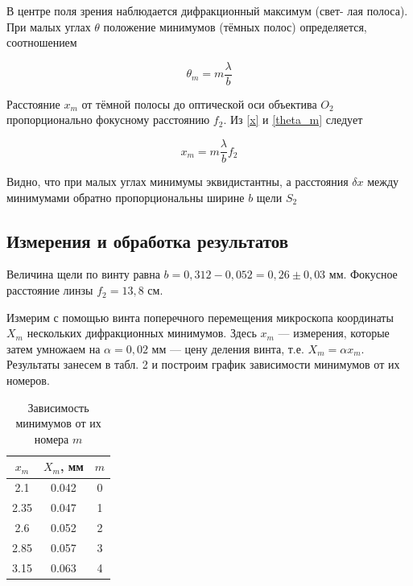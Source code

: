 \documentclass[12pt]{kiarticle} %
\begin{document}
В центре поля зрения наблюдается дифракционный максимум (свет-
лая полоса). При малых углах $ \theta $ положение минимумов (тёмных полос)
определяется, соотношением

\begin{equation}\label{theta_m}
\theta_m = m \dfrac{\lambda}{b}
\end{equation}

Расстояние $ x_m $ от тёмной полосы до оптической оси объектива $ O_2 $ пропорционально фокусному расстоянию $ f_2 $. Из \eqref{x} и \eqref{theta_m} следует 

\begin{equation}\label{xm}
x_m = m \dfrac{\lambda}{b} f_2
\end{equation}

Видно, что при малых углах минимумы эквидистантны, а
расстояния $ \delta x $ между минимумами обратно пропорциональны ширине $ b $ щели $ S_2 $

\subsection{Измерения и обработка результатов}

Величина щели по винту равна $ b = 0,312 - 0,052 = 0,26 \pm 0,03 $ мм. Фокусное расстояние линзы $ f_2 = 13,8 $ см.

Измерим с помощью винта поперечного перемещения микроскопа координаты $ X_m $ нескольких дифракционных минимумов. Здесь $ x_m $ --- измерения, которые затем умножаем на $ \alpha = 0,02 $ мм --- цену деления винта, т.е. $ X_m = \alpha x_m $.
 Результаты занесем в табл. 2 и построим график зависимости минимумов от их номеров. 

\begin{table}[h!]
	\caption{Зависимость минимумов от их номера $ m $}
	\begin{center}
		\begin{tabular}{|c|c|c|}
			\hline
			$ x_m $ & $ X_m $, мм & $ m $ \\
			\hline
			 2.1 & 0.042 & 0 \\
			2.35 & 0.047 & 1 \\
			2.6 & 0.052 & 2 \\
			2.85 & 0.057 & 3 \\
			3.15 & 0.063 & 4 \\
			\hline
		\end{tabular}
	\end{center}
	\label{}
\end{table}
\end{document}
